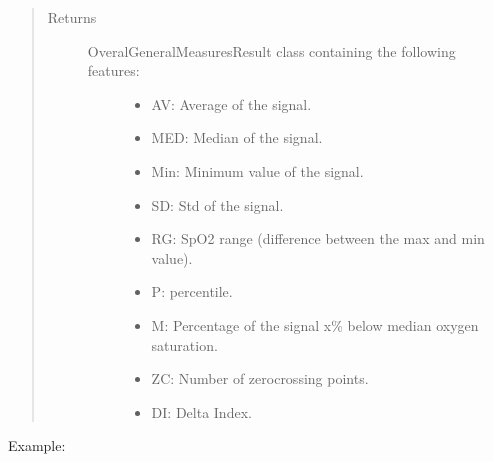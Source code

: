 \documentclass[letterpaper,10pt,english]{sphinxmanual}
\begin{document}
\begin{fulllineitems}
\begin{fulllineitems}
\begin{quote}
\begin{description}
\item[{Returns}] \leavevmode
\begin{description}
\item[{OveralGeneralMeasuresResult class containing the following features:}] \leavevmode\begin{itemize}
\item {} 
AV: Average of the signal.

\item {} 
MED: Median of the signal.

\item {} 
Min: Minimum value of the signal.

\item {} 
SD: Std of the signal.

\item {} 
RG: SpO2 range (difference between the max and min value).

\item {} 
P: percentile.

\item {} 
M: Percentage of the signal x\% below median oxygen saturation.

\item {} 
ZC: Number of zero\sphinxhyphen{}crossing points.

\item {} 
DI: Delta Index.

\end{itemize}

\end{description}


\end{description}\end{quote}

Example:

\begin{sphinxVerbatim}[commandchars=\\\{\}]
   

     

  
\end{sphinxVerbatim}

\end{fulllineitems}


\end{fulllineitems}
\end{document}

